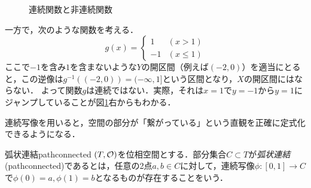 \documentclass[11pt,a4paper, dvipdfmx]{jsarticle}
\begin{document}
\begin{figure}[h]
  \begin{minipage}[b]{0.45\linewidth}
    \centering
  \end{minipage}
  \begin{minipage}[b]{0.45\linewidth}
  \end{minipage}
 \caption{連続関数と非連続関数}
 \label{fig:realcontinuous}
\end{figure}

一方で，次のような関数を考える．
\[
g(x) = \left\{
\begin{array}{ll}
1 & (x > 1)\\
-1 & (x \leq 1)
\end{array}
\right. 
\]
ここで$-1$を含み$1$を含まないような$Y$の開区間（例えば$(-2, 0)$）を適当にとると，この逆像は$g^{-1}((-2, 0)) = (-\infty, 1]$という区間となり，$X$の開区間にはならない．
よって関数$g$は連続ではない．実際，それは$x=1$で$y=-1$から$y=1$にジャンプしていることが図\ref{fig:realcontinuous}右からもわかる．



連続写像を用いると，空間の部分が「繋がっている」という直観を正確に定式化できるようになる．

\begin{dfn}{弧状連結}{pathconnected}
  $(T,\mathcal{O})$を位相空間とする．部分集合$C \subset T$が\emph{弧状連結}(pathconnected)であるとは，任意の2点$a, b \in C$に対して，連続写像$\phi: [0,1] \to C$で$\phi(0)=a, \phi(1)=b$となるものが存在することをいう．
\end{dfn}
\end{document}
